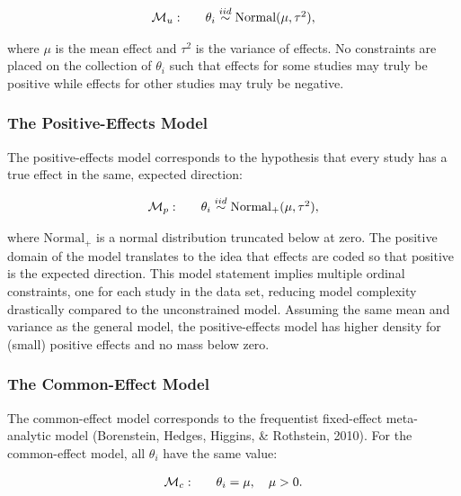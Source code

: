 \documentclass[english,,man]{apa6}
\begin{document}
\[
\begin{array}{llr}
{\cal M}_u: && \theta_i \stackrel{iid}{\sim} \mbox{Normal}(\mu,\tau^2),\\
\end{array}
\]

where \(\mu\) is the mean effect and \(\tau^2\) is the variance of effects. No constraints are placed on the collection of \(\theta_i\) such that effects for some studies may truly be positive while effects for other studies may truly be negative.

\hypertarget{the-positive-effects-model}{%
\subsubsection{The Positive-Effects Model}\label{the-positive-effects-model}}

The positive-effects model corresponds to the hypothesis that every study has a true effect in the same, expected direction:

\[
\begin{array}{llr}
{\cal M}_p: && \theta_i \stackrel{iid}{\sim} \mbox{Normal}_+(\mu,\tau^2),\\
\end{array}
\]

where \(\mbox{Normal}_+\) is a normal distribution truncated below at zero. The positive domain of the model translates to the idea that effects are coded so that positive is the expected direction. This model statement implies multiple ordinal constraints, one for each study in the data set, reducing model complexity drastically compared to the unconstrained model. Assuming the same mean and variance as the general model, the positive-effects model has higher density for (small) positive effects and no mass below zero.

\hypertarget{the-common-effect-model}{%
\subsubsection{The Common-Effect Model}\label{the-common-effect-model}}

The common-effect model corresponds to the frequentist fixed-effect meta-analytic model (Borenstein, Hedges, Higgins, \& Rothstein, 2010). For the common-effect model, all \(\theta_i\) have the same value:

\[
  \begin{array}{llr}
{\cal M}_c: && \theta_i = \mu, \quad \mu > 0.\\
\end{array}
\]
\end{document}

